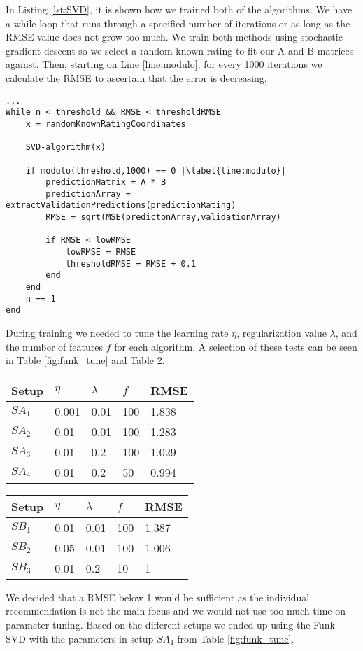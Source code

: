 In Listing \ref{lst:SVD}, it is shown how we trained both of the algorithms. We have a while-loop that runs through a specified number of iterations or as long as the RMSE value does not grow too much.
We train both methods using stochastic gradient descent so we select a random known rating to fit our A and B matrices against. Then, starting on Line \ref{line:modulo}, for every 1000 iterations we calculate the RMSE to ascertain that the error is decreasing. 

\begin{lstlisting}[caption={Training of the prediction matrix},label=lst:SVD,escapechar=|]
...
While n < threshold && RMSE < thresholdRMSE
	x = randomKnownRatingCoordinates
	
	SVD-algorithm(x)
	
	if modulo(threshold,1000) == 0 |\label{line:modulo}|
		predictionMatrix = A * B
		predictionArray = extractValidationPredictions(predictionRating)
		RMSE = sqrt(MSE(predictonArray,validationArray)	
		
		if RMSE < lowRMSE 
			lowRMSE = RMSE 
			thresholdRMSE = RMSE + 0.1
		end
	end
	n += 1
end
\end{lstlisting}

During training we needed to tune the learning rate $\eta$, regularization value $\lambda$, and the number of features $f$ for each algorithm. A selection of these tests can be seen in Table \ref{fig:funk_tune} and Table \ref{fig:SVD_tune}.
\begin{table}[h]
\centering
\begin{minipage}{.48\textwidth}\centering
\begin{tabular}{|l|llll|}
\hline
Setup	& $\eta$ & $\lambda$ & $f$   & RMSE   \\ \hline
$SA_1$	& 0.001  & 0.01      & 100 & 1.838 \\ \hline
$SA_2$	& 0.01   & 0.01      & 100 & 1.283 \\ \hline
$SA_3$	& 0.01   & 0.2       & 100 & 1.029 \\ \hline
$SA_4$	& 0.01   & 0.2		 & 50  & 0.994 \\ \hline
\end{tabular}
\label{fig:funk_tune}
\end{minipage}
\hfill
\begin{minipage}{.48\textwidth}\centering
\begin{tabular}{|l|llll|}
\hline
Setup	& $\eta$ & $\lambda$ & $f$   & RMSE \\ \hline
$SB_1$	& 0.01   & 0.01   & 100 & 1.387   \\ \hline
$SB_2$	& 0.05   & 0.01   & 100 & 1.006  \\ \hline
$SB_3$	& 0.01   & 0.2    & 10 	& 1		  \\ \hline
\end{tabular}
\label{fig:SVD_tune}
\end{minipage}
\end{table}

We decided that a RMSE below 1 would be sufficient as the individual recommendation is not the main focus and we would not use too much time on parameter tuning. Based on the different setups we ended up using the Funk-SVD with the parameters in setup $SA_4$ from Table \ref{fig:funk_tune}.
